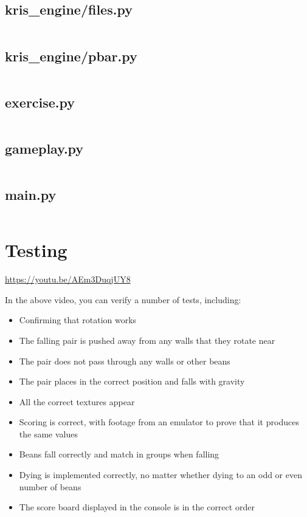 \documentclass{report}
\begin{document}
\section{kris\_engine/files.py}

\inputminted[breaklines, linenos]{python}{../game/kris_engine/files.py}

\section{kris\_engine/pbar.py}

\inputminted[breaklines, linenos]{python}{../game/kris_engine/pbar.py}

\section{exercise.py}

\inputminted[breaklines, linenos]{python}{../game/exercise.py}

\section{gameplay.py}

\inputminted[breaklines, linenos]{python}{../game/gameplay.py}

\section{main.py}

\inputminted[breaklines, linenos]{python}{../game/main.py}

\chapter{Testing}

\href{https://youtu.be/AEm3DuqjUY8}{https://youtu.be/AEm3DuqjUY8}

In the above video, you can verify a number of tests, including:
\begin{itemize}
    \item Confirming that rotation works
    \item The falling pair is pushed away from any walls that they rotate near 
    \item The pair does not pass through any walls or other beans
    \item The pair places in the correct position and falls with gravity
    \item All the correct textures appear
    \item Scoring is correct, with footage from an emulator to prove that it produces the same values
    \item Beans fall correctly and match in groups when falling
    \item Dying is implemented correctly, no matter whether dying to an odd or even number of beans
    \item The score board displayed in the console is in the correct order
\end{itemize}
\end{document}
